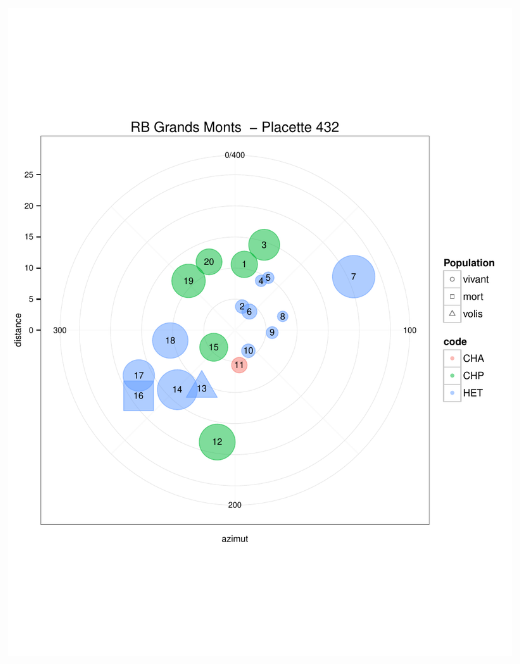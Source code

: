 \documentclass[a4paper]{book}\usepackage[]{graphicx}\usepackage[]{color}
\makeatletter
\def\maxwidth{ %
  \ifdim\Gin@nat@width>\linewidth
    \linewidth
  \else
    \Gin@nat@width
  \fi
}
\newenvironment{knitrout}{}{} %
\makeatother
\begin{document}
\begin{knitrout}
{\centering \includegraphics[width=\maxwidth]{Figures/PlanArbres-41} 

}





\end{knitrout}
\end{document}
